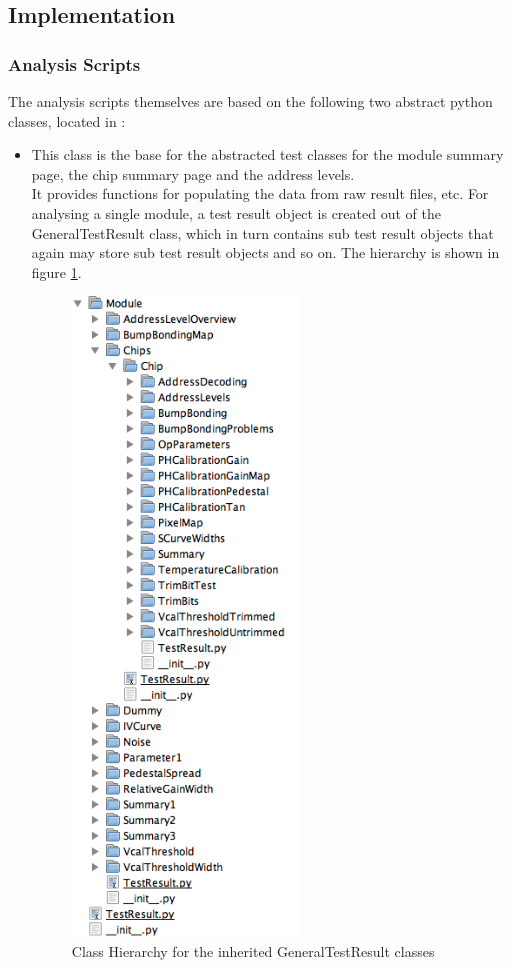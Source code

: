 \documentclass[0_Bericht]{subfiles}
\begin{document}
		\subsection{Implementation}
			\subsubsection{Analysis Scripts}
				The analysis scripts themselves are based on the following two abstract python classes, located in :
				\begin{itemize}
					\item {}
						This class is the base for the abstracted test classes for the module summary page, the chip summary page and the address levels. \\ 
						It provides functions for populating the data from raw result files, etc.
						For analysing a single module, a test result object is created out of the GeneralTestResult class, which in turn contains sub test result objects that again may store sub test result objects and so on. The hierarchy is shown in figure \ref{fig:ClassHierarchy}.
						\begin{figure}[h!]
							\centering
							\includegraphics[width=60mm]{Content/Graphics/4_6_ClassHierarchy.png}
							\caption{Class Hierarchy for the inherited GeneralTestResult classes}
							\label{fig:ClassHierarchy}
						\end{figure}
						

\end{itemize}
\end{document}
